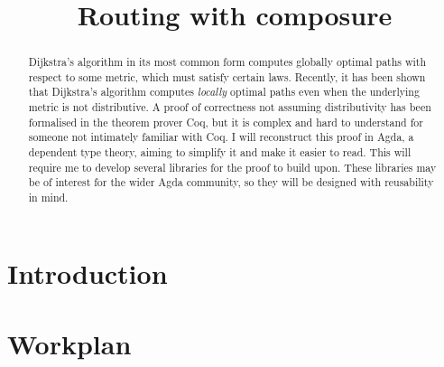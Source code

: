 \documentclass[a4paper]{scrartcl}
\title{\phantomsection%
  Routing with composure%
  \label{generalised-big-operators-in-agda}}
\author{}
\date{}
\begin{document}
\maketitle

% 
% 
% 


\begin{abstract}
Dijkstra's algorithm in its most common form computes globally optimal paths with respect to some metric, which must satisfy certain laws. Recently, it has been shown that Dijkstra's algorithm computes \emph{locally} optimal paths even when the underlying metric is not distributive. A proof of correctness not assuming distributivity has been formalised in the theorem prover Coq, but it is complex and hard to understand for someone not intimately familiar with Coq. I will reconstruct this proof in Agda, a dependent type theory, aiming to simplify it and make it easier to read. This will require me to develop several libraries for the proof to build upon. These libraries may be of interest for the wider Agda community, so they will be designed with reusability in mind.
\end{abstract}

\section{Introduction%
  \label{introduction}%
}

\section{Workplan%
  \label{workplan}%
}
\end{document}
